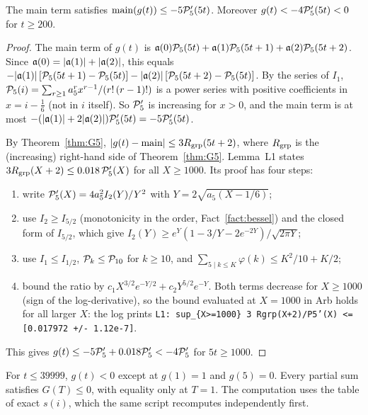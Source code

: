\begin{lemma}\label{lem:t-L1}
The main term satisfies $\mathrm{main}(g(t))\le-5\mathcal P_5'(5t)$. Moreover $g(t)<-4\mathcal P_5'(5t)<0$ for $t\ge200$.
\end{lemma}
\begin{proof}
The main term of $g(t)$ is $\mathfrak a(0)\mathcal P_5(5t)+\mathfrak a(1)\mathcal P_5(5t+1)+\mathfrak a(2)\mathcal P_5(5t+2)$. Since $\mathfrak a(0)=|\mathfrak a(1)|+|\mathfrak a(2)|$, this
equals $-|\mathfrak a(1)|\,[\mathcal P_5(5t+1)-\mathcal P_5(5t)]-|\mathfrak a(2)|\,[\mathcal P_5(5t+2)-\mathcal P_5(5t)]$. By the series of $I_1$,
$\mathcal P_5(i)=\sum_{r\ge1}a_5^r x^{r-1}/(r!\,(r-1)!)$ is a power series with positive coefficients in $x=i-\tfrac16$ (not in
$i$ itself). So $\mathcal P_5'$ is increasing for $x>0$, and the main term is at most
$-(|\mathfrak a(1)|+2|\mathfrak a(2)|)\mathcal P_5'(5t)=-5\mathcal P_5'(5t)$.

By Theorem~\ref{thm:G5}, $|g(t)-\mathrm{main}|\le3R_{\rm grp}(5t+2)$, where $R_{\rm grp}$ is the (increasing) right-hand
side of Theorem~\ref{thm:G5}. Lemma~L1 states $3R_{\rm grp}(X+2)\le0.018\,\mathcal P_5'(X)$ for all $X\ge1000$. Its proof has four
steps:
\begin{enumerate}
\item write $\mathcal P_5'(X)=4a_5^2I_2(Y)/Y^2$ with $Y=2\sqrt{a_5(X-1/6)}$;
\item use $I_2\ge I_{5/2}$ (monotonicity in the order, Fact~\ref{fact:bessel}) and the closed form of $I_{5/2}$, which give
$I_2(Y)\ge e^Y(1-3/Y-2e^{-2Y})/\sqrt{2\pi Y}$;
\item use $I_1\le I_{1/2}$, $\mathcal P_k\le\mathcal P_{10}$ for $k\ge10$, and $\sum_{5\mid k\le K}\varphi(k)\le K^2/10+K/2$;
\item bound the ratio by $c_1X^{3/2}e^{-Y/2}+c_2Y^{5/2}e^{-Y}$. Both terms decrease for $X\ge1000$ (sign of the
log-derivative), so the bound evaluated at $X=1000$ in Arb holds for all larger $X$: the log prints
\texttt{L1: sup\_\{X>=1000\} 3 Rgrp(X+2)/P5'(X) <= [0.017972 +/- 1.12e-7]}.
\end{enumerate}
This gives $g(t)\le-5\mathcal P_5'+0.018\mathcal P_5'<-4\mathcal P_5'$ for $5t\ge1000$.
\end{proof}

\begin{lemma}[exact]\label{lem:t-block-exact}
For $t\le39999$, $g(t)<0$ except at $g(1)=1$ and $g(5)=0$. Every partial sum satisfies $G(T)\le0$, with equality only at
$T=1$. The computation uses the table of exact $s(i)$, which the same script recomputes independently first.
\end{lemma}

